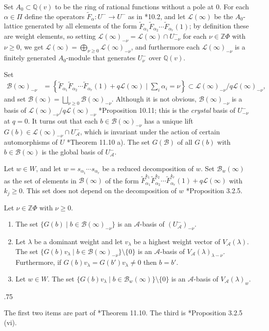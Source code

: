 \documentclass[11pt,fleqn]{article}
\makeatletter
\renewenvironment{proof}[1][\textit{Proof}]{\par
  \pushQED{\qed}%
  \normalfont \topsep.75\paraskip\relax
  \trivlist
  \item[\hskip\labelsep
        \itshape
    #1\@addpunct{.}]\ignorespaces
}{%
  \popQED\endtrivlist\@endpefalse
}
\newcommand\QQ{\mathbb Q}
\newcommand\ZZ{\mathbb Z}
\renewcommand\to{\longrightarrow}
\newcommand\A{\mathcal A}
\newcommand\B{\mathcal B}
\renewcommand\L{\mathcal L}
\makeatother
\begin{document}
Set $A_0 \subset \QQ(v)$ to be the ring of rational functions without a pole 
at $0$. For each $\alpha \in \Pi$ define the operators $\tilde F_\alpha: 
U^- \to U^-$ as in \cite{Jan}*{10.2}, and let $\L(\infty)$ be the 
$A_0$-lattice generated by all elements of the form $\tilde F_{\alpha_1} 
\tilde F_{\alpha_2} \cdots \tilde F_{\alpha_r}(1)$; by definition these are 
weight elements, so setting $\L(\infty)_{-\nu} = \L(\infty) \cap U^-_{-\nu}$ 
for each $\nu \in \ZZ \Phi$ with $\nu \geq 0$, we get $\L(\infty) = 
\bigoplus_{\nu \geq 0} \L(\infty)_{-\nu}$, and furthermore each 
$\L(\infty)_{-\nu}$ is a finitely generated $A_0$-module that generates 
$U^-_\nu$ over $\QQ(v)$. 

Set
\begin{align*}
\B(\infty)_{-\nu} 
  &=  \left\{\tilde F_{\alpha_1} \tilde F_{\alpha_2} \cdots 
    \tilde F_{\alpha_r}(1) + q\L(\infty) \mid \sum_{i} \alpha_{i} = \nu\right\}
    \subset \L(\infty)_{-\nu}/q\L(\infty)_{-\nu},
\end{align*}
and set $\B(\infty) = \bigsqcup_{\nu \geq 0} \B(\infty)_{-\nu}$. Although it is
not obvious, $\B(\infty)_{-\nu}$ is a basis of $\L(\infty)_{-\nu} / 
q \L(\infty)_{-\nu}$ \cite{Jan}*{Proposition 10.11}; this is the \emph{crystal}
basis of $U^-_{-\nu}$ at $q = 0$. It turns out that each 
$b \in \B(\infty)_{-\nu}$ has a unique lift $G(b) \in \L(\infty)_{-\nu} \cap 
U_\A^-$, which is invariant under the action of certain automorphisms 
of $U$ \cite{Jan}*{Theorem 11.10 a)}. The set $G(\B)$ of all $G(b)$ with $b 
\in \B(\infty)$ is the global basis of $U_\A^-$.

Let $w \in W$, and let $w = s_{\alpha_1}\cdots s_{\alpha_r}$ be a reduced 
decomposition of $w$. Set $\B_w(\infty)$ as the set of elements in $\B(\infty)$
of the form $\tilde F_{\alpha_1}^{k_1} \tilde F_{\alpha_2}^{k_2} \cdots \tilde 
F_{\alpha_r}^{k_r}(1) + q\L(\infty)$ with $k_j \geq 0$. This set does not 
depend on the decomposition of $w$ \cite{K1}*{Proposition 3.2.5}.

\begin{Theorem*}
Let $\nu \in \ZZ \Phi$ with $\nu \geq 0$.
\begin{enumerate}[label=(\alph*)]
\item The set $\{G(b) \mid b \in \B(\infty)_{-\nu}\}$ is an $\A$-basis of 
$(U_\A^-)_{- \nu}$.

\item Let $\lambda$ be a dominant weight and let $v_\lambda$ be a highest 
weight vector of $V_\A(\lambda)$. The set $\{G(b)v_\lambda \mid b \in 
\B(\infty)_{-\nu}\} \setminus \{0\}$ is an $\A$-basis of 
$V_\A(\lambda)_{\lambda - \nu}$. Furthermore, if $G(b)v_\lambda = 
G(b')v_\lambda \neq 0$ then $b = b'$.

\item Let $w \in W$. The set $\{G(b)v_\lambda \mid b \in \B_w(\infty)\} 
\setminus \{0\}$ is an $\A$-basis of $V_\A(\lambda)_{w}$. 
\end{enumerate}
\end{Theorem*}
\begin{proof}
The first two items are part of \cite{Jan}*{Theorem 11.10}. The third is 
\cite{K1}*{Proposition 3.2.5 (vi)}.
\end{proof}
\end{document}

